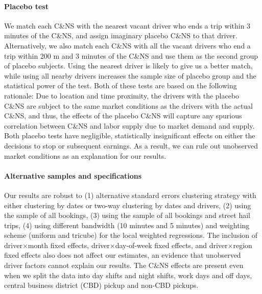 \documentclass[reviewmode,AEJ]{AEA}
\begin{document}
\paragraph{Placebo test}
We match each C\&NS with the nearest vacant driver who ends a trip within 3 minutes of the C\&NS, and assign imaginary placebo C\&NS to that driver. Alternatively, we also match each C\&NS with all the vacant drivers who end a trip within 200 m and 3 minutes of the C\&NS and use them as the second group of placebo subjects. Using the nearest driver is likely to give us a better match, while using all nearby drivers increases the sample size of placebo group and the statistical power of the test. Both of these tests are based on the following rationale: Due to location and time proximity, the drivers with the placebo C\&NS are subject to the same market conditions as the drivers with the actual C\&NS, and thus, the effects of the placebo C\&NS will capture any spurious correlation between C\&NS and labor supply due to market demand and supply. Both placebo tests %
have negligible, statistically insignificant effects on either the decisions to stop or subsequent earnings. As a result, we can rule out unobserved market conditions as an explanation for our results.



\paragraph{Alternative samples and specifications} Our results are robust to (1) alternative standard errors clustering strategy with either clustering by dates or two-way clustering by dates and drivers, (2) using the sample of all bookings, (3) using the sample of all bookings and street hail trips, (4) using different bandwidth (10 minutes and 5 minutes) and weighting scheme (uniform and tricube) for the local weighted regressions. The inclusion of driver\(\times\)month fixed effects, driver\(\times\)day-of-week fixed effects, and driver\(\times\)region fixed effects also does not affect our estimates, an evidence that unobserved driver factors cannot explain our results. The C\&NS effects are present even when we split the data into day shifts and night shifts, work days and off days, central business district (CBD) pickup and non-CBD pickups.  
\end{document}
